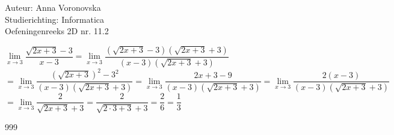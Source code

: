 \documentclass[a4paper]{article}
\begin{document}
  
\noindent \large Auteur: Anna Voronovska \\
\noindent \large Studierichting: Informatica\\
\noindent \large Oefeningenreeks 2D nr. 11.2\\

\medskip

\normalsize

$\lim\limits_{x \to 3} \dfrac{\sqrt{2x+3}-3}{x-3} = \lim\limits_{x \to 3} \dfrac{(\sqrt{2x+3}-3)(\sqrt{2x+3}+3)}{(x-3)(\sqrt{2x+3}+3)}$\\

$= \lim\limits_{x \to 3} \dfrac{(\sqrt{2x+3})^2 - 3^2}{(x-3)(\sqrt{2x+3}+3)} = \lim\limits_{x \to 3}\dfrac{2x+3-9}{(x-3)(\sqrt{2x+3}+3)} = \lim\limits_{x \to 3}\dfrac{2(x-3)}{(x-3)(\sqrt{2x+3}+3)}$\\

$= \lim\limits_{x \to 3} \dfrac{2}{\sqrt{2x+3}+3} = \dfrac{2}{\sqrt{2 \cdot 3+3}+3} = \dfrac{2}{6} = \dfrac{1}{3}$\\


\begin{thebibliography}{999}
\end{thebibliography}
\end{document}
